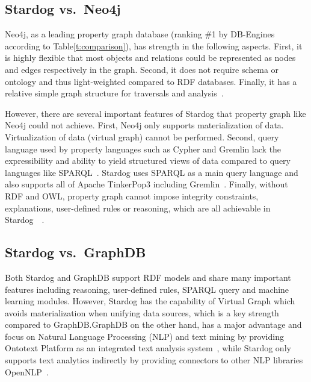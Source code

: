 \subsection{Stardog vs.\ Neo4j}
Neo4j, as a leading property graph database (ranking \#1 by DB-Engines 
according to Table\ref{t:comparison}), has strength in the following aspects. 
First, it is highly flexible that most objects and relations could be represented 
as nodes and edges respectively in the graph. Second, it does not require 
schema or ontology and thus light-weighted compared to RDF databases. 
Finally, it has a relative simple graph structure for traversals and 
analysis~\cite{hid-sp18-405-robinson2013graphdatabase-stardog}. 

However, there are several important features of Stardog that property graph 
like Neo4j could not achieve. First, Neo4j only supports materialization of 
data. Virtualization of data (virtual graph) cannot be performed. Second, 
query language used by property languages such as Cypher and Gremlin lack 
the expressibility and ability to yield structured views of data compared to 
query languages like SPARQL~\cite{hid-sp18-405-angles2008expre-stardog}. 
Stardog uses SPARQL as a main query language and also supports all of 
Apache TinkerPop3 including 
Gremlin~\cite{hid-sp18-405-www-stardog-docs}. Finally, without RDF and 
OWL, property graph cannot impose integrity constraints, explanations, 
user-defined rules or reasoning, which are all achievable in 
Stardog~\cite{hid-sp18-405-www-stardog-dbengines-neo4j}~\cite{hid-sp18-405-www-stardog-docs}.
 
\subsection{Stardog vs.\ GraphDB}
Both Stardog and GraphDB support RDF models and share many important 
features including reasoning, user-defined rules, SPARQL query and machine 
learning modules. However, Stardog has the capability of Virtual Graph which 
avoids materialization when unifying data sources, which is a key strength 
compared to GraphDB.\@ GraphDB on the other hand, has a major advantage 
and focus on Natural Language Processing (NLP) and text mining by 
providing Ontotext Platform as an integrated text analysis 
system~\cite{hid-sp18-405-www-stardog-ontotext}, while Stardog only 
supports text analytics indirectly by providing connectors to other NLP 
libraries OpenNLP~\cite{hid-sp18-405-www-stardog-docs}. 

